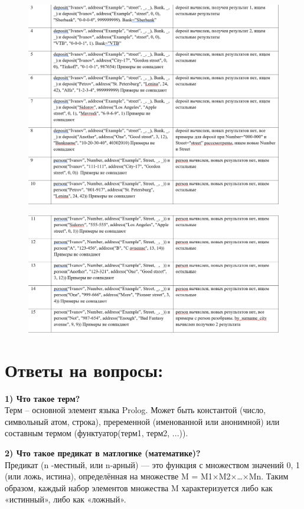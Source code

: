 \documentclass[a4paper, 12pt]{article}
\begin{document}
\clearpage
\newpage
\begin{figure}[h!]
	\centering \includegraphics[scale=0.8]{3.7}
\end{figure}
\begin{figure}[h!]
	\centering \includegraphics[scale=0.8]{3.8}
\end{figure}

\section*{Ответы на вопросы:}
\hspace*{-7mm} \textbf{1) Что такое терм?}
\\ Терм – основной элемент языка Prolog. Может быть константой (число, символьный атом, строка), преременной (именованной или анонимной) или составным термом (функтуатор(терм1, терм2, ...)).


\hspace*{-13mm} \textbf{2) Что такое предикат в матлогике (математике)?}
\\ Предикат (n -местный, или n-арный) — это функция с множеством значений {0, 1} (или {ложь, истина}), определённая на множестве M = M1×M2×…×Mn. Таким образом, каждый набор элементов множества M характеризуется либо как «истинный», либо как «ложный».
\end{document}
